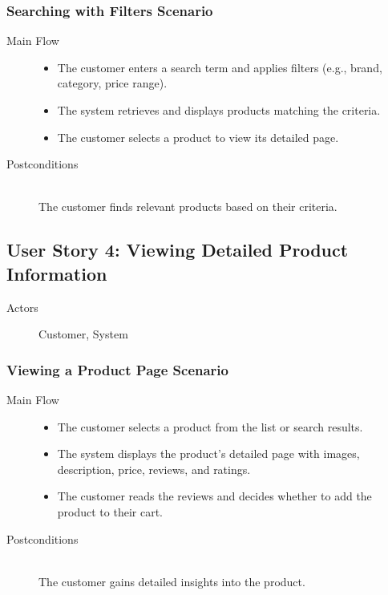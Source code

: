 \documentclass[a4paper,journal]{IEEEtran}
\begin{document}
\subsubsection{Searching with Filters Scenario}
\begin{description}
  \item[Main Flow] \hfill
    \begin{itemize}
      \item The customer enters a search term and applies filters
        (e.g., brand, category, price range).
      \item The system retrieves and displays products matching the criteria.
      \item The customer selects a product to view its detailed page.
    \end{itemize}
  \item[Postconditions] \hfill \\
    The customer finds relevant products based on their criteria.
\end{description}

\subsection{User Story 4: Viewing Detailed Product Information}
\begin{description}
  \item[Actors] Customer, System
\end{description}
\subsubsection{Viewing a Product Page Scenario}
\begin{description}
  \item[Main Flow] \hfill
    \begin{itemize}
      \item The customer selects a product from the list or search results.
      \item The system displays the product's detailed page with images,
        description, price, reviews, and ratings.
      \item The customer reads the reviews and decides whether to add the
        product to their cart.
    \end{itemize}
  \item[Postconditions] \hfill \\
    The customer gains detailed insights into the product.
\end{description}
\end{document}
